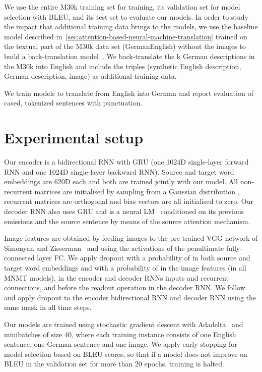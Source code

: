 \documentclass[11pt,twocolumn]{article}
\begin{document}
We use the entire M30k
training set for training, its validation set for model selection with BLEU, and its test set to evaluate our models.
In order to study the impact that additional training data brings to the models,
we use the baseline model described in~\cref{sec:attention-based-neural-machine-translation} trained on the textual part of the M30k data set (GermanEnglish) without the images to build a back-translation model~\cite{Sennrichetal2016a}.
We back-translate the k German descriptions in the M30k into English and include the triples (synthetic English description, German description, image) as additional training data.

We train models to translate from English into German and report evaluation of cased, tokenized sentences with punctuation.

\section{Experimental setup}
\label{sec:experiments}

Our encoder is a bidirectional RNN with GRU
(one 1024D single-layer forward RNN and one 1024D single-layer backward RNN).
Source and target word embeddings are 620D each
and both are trained jointly with our model.
All non-recurrent matrices are initialised by sampling from
a Gaussian distribution ,
recurrent matrices are orthogonal and
bias vectors are all initialised to zero.
Our decoder RNN also uses GRU and is a neural LM~\cite{Bengioetal2003} conditioned on its previous emissions and the source sentence by means of the source attention mechanism.

Image features are obtained by feeding images to the pre-trained VGG network of Simonyan and Zisserman~ and using the activations of the penultimate fully-connected layer FC.
We apply dropout with a probability of  in both source and target word embeddings and with a probability of  in the image features (in all MNMT models), in the encoder and decoder RNNs inputs and recurrent connections, and before the readout operation in the decoder RNN.
We follow~ and apply dropout to the encoder bidirectional RNN and decoder RNN using the same mask in all time steps.

Our models are trained using
stochastic gradient descent with Adadelta~\cite{Zeiler2012} and minibatches of size 40, where each training instance consists of one English sentence, one German sentence and one image.
We apply early stopping for model selection based on BLEU scores, so that if a model does not improve on BLEU in the validation set for more than 20 epochs, training is halted.
\end{document}
